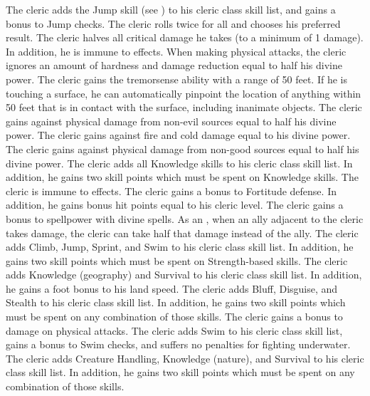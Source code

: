             The cleric adds the Jump skill (see ) to his cleric class skill list, and gains a  bonus to Jump checks.
            The cleric rolls twice for all  and chooses his preferred result.
            The cleric halves all critical damage he takes (to a minimum of 1 damage).
            In addition, he is immune to  effects.
            When making physical attacks, the cleric ignores an amount of hardness and damage reduction equal to half his divine power.
            The cleric gains the tremorsense ability with a range of 50 feet.
            If he is touching a surface, he can automatically pinpoint the location of anything within 50 feet that is in contact with the surface, including inanimate objects.
            The cleric gains  against physical damage from non-evil sources equal to half his divine power.
            The cleric gains  against fire and cold damage equal to his divine power.
            The cleric gains  against physical damage from non-good sources equal to half his divine power.
            The cleric adds all Knowledge skills to his cleric class skill list.
            In addition, he gains two skill points which must be spent on Knowledge skills.
            The cleric is immune to  effects.
            The cleric gains a  bonus to Fortitude defense.
            In addition, he gains bonus hit points equal to his cleric level.
            The cleric gains a  bonus to spellpower with divine spells.
            As an , when an ally adjacent to the cleric takes damage, the cleric can take half that damage instead of the ally.
            The cleric adds Climb, Jump, Sprint, and Swim to his cleric class skill list.
            In addition, he gains two skill points which must be spent on Strength-based skills.
            The cleric adds Knowledge (geography) and Survival to his cleric class skill list.
            In addition, he gains a  foot bonus to his land speed.
            The cleric adds Bluff, Disguise, and Stealth to his cleric class skill list.
            In addition, he gains two skill points which must be spent on any combination of those skills.
            The cleric gains a  bonus to damage on physical attacks.
            The cleric adds Swim to his cleric class skill list, gains a  bonus to Swim checks, and suffers no penalties for fighting underwater.
            The cleric adds Creature Handling, Knowledge (nature), and Survival to his cleric class skill list.
            In addition, he gains two skill points which must be spent on any combination of those skills.

